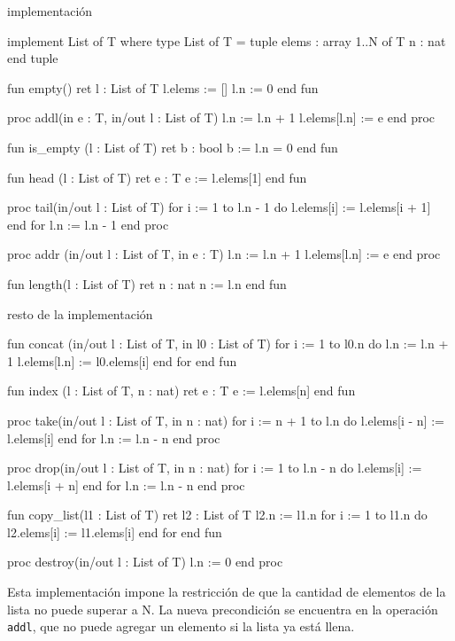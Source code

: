 \begin{codebox}{implementación}
\begin{pascallike}
implement List of T where
type List of T = tuple
                   elems : array 1..N of T
                   n : nat
                 end tuple

fun empty() ret l : List of T
    l.elems := []
    l.n := 0
end fun

proc addl(in e : T, in/out l : List of T)
    l.n := l.n + 1
    l.elems[l.n] := e
end proc

fun is_empty (l : List of T) ret b : bool
    b := l.n = 0
end fun

fun head (l : List of T) ret e : T
    e := l.elems[1]
end fun

proc tail(in/out l : List of T)
    for i := 1 to l.n - 1 do
        l.elems[i] := l.elems[i + 1]
    end for
    l.n := l.n - 1
end proc

proc addr (in/out l : List of T, in e : T)
    l.n := l.n + 1
    l.elems[l.n] := e
end proc

fun length(l : List of T) ret n : nat
    n := l.n
end fun
\end{pascallike}
\end{codebox}
\begin{codebox}{resto de la implementación}
\begin{pascallike}
fun concat (in/out l : List of T, in l0 : List of T)
    for i := 1 to l0.n do
        l.n := l.n + 1
        l.elems[l.n] := l0.elems[i]
    end for
end fun

fun index (l : List of T, n : nat) ret e : T
    e := l.elems[n]
end fun

proc take(in/out l : List of T, in n : nat)
    for i := n + 1 to l.n do
        l.elems[i - n] := l.elems[i]
    end for
    l.n := l.n - n
end proc

proc drop(in/out l : List of T, in n : nat)
    for i := 1 to l.n - n do
        l.elems[i] := l.elems[i + n]
    end for
    l.n := l.n - n
end proc

fun copy_list(l1 : List of T) ret l2 : List of T
    l2.n := l1.n
    for i := 1 to l1.n do
        l2.elems[i] := l1.elems[i]
    end for
end fun

proc destroy(in/out l : List of T)
    l.n := 0
end proc
\end{pascallike}
\end{codebox}

Esta implementación impone la restricción de que la cantidad de elementos de la lista no puede superar a N. La nueva precondición se encuentra en la operación \texttt{addl}, que no puede agregar un elemento si la lista ya está llena.

